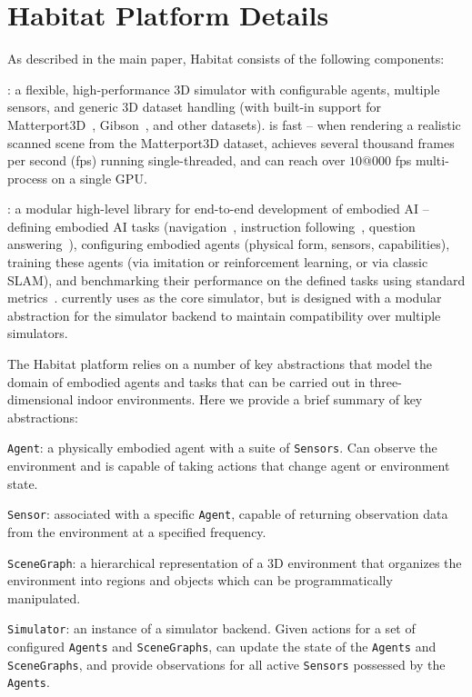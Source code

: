 \section{Habitat Platform Details}

As described in the main paper, Habitat consists of the following components:
\begin{compactitem}
  \item \habitatsim: a flexible, high-performance 3D simulator with configurable agents, multiple sensors, and generic 3D dataset handling (with built-in support for Matterport3D~\cite{Chang2017}, Gibson~\cite{Xia2018}, and other datasets). \habitatsim is fast -- when rendering a realistic scanned scene from the Matterport3D dataset, \habitatsim achieves several thousand frames per second (fps) running single-threaded, and can reach over $10@000$ fps multi-process on a single GPU.

  \item \habitatapi: a modular high-level library for end-to-end development of embodied AI -- defining embodied AI tasks (\eg navigation~\cite{Anderson2018-Evaluation}, instruction following~\cite{Anderson2018-Language}, question answering~\cite{embodiedqa}), 
  configuring embodied agents (physical form, sensors, capabilities), training these agents (via imitation or reinforcement learning, or via classic SLAM), and benchmarking their performance on the defined tasks using standard metrics~\cite{Anderson2018-Evaluation}. 
  \habitatapi currently uses \habitatsim as the core simulator, 
  but is designed with a modular abstraction for the simulator 
  backend to maintain compatibility over multiple simulators.
\end{compactitem}

The Habitat platform relies on a number of key abstractions that model the domain of embodied agents and tasks that can be carried out in three-dimensional indoor environments.
Here we provide a brief summary of key abstractions:
\begin{compactitem}
    \item \texttt{Agent}: a physically embodied agent with a suite of \texttt{Sensors}. Can observe the environment and is capable of taking actions that change agent or environment state.
    \item \texttt{Sensor}: associated with a specific \texttt{Agent}, capable of returning observation data from the environment at a specified frequency.
    \item \texttt{SceneGraph}: a hierarchical representation of a 3D environment that organizes the environment into regions and objects which can be programmatically manipulated.
    \item \texttt{Simulator}: an instance of a simulator backend. Given actions for a set of configured \texttt{Agents} and \texttt{SceneGraphs}, can update the state of the \texttt{Agents} and \texttt{SceneGraphs}, and provide observations for all active \texttt{Sensors} possessed by the \texttt{Agents}.
\end{compactitem}

